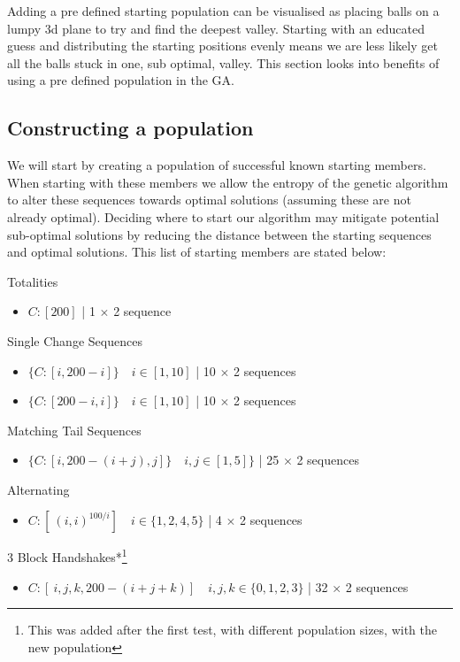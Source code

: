 Adding a pre defined starting population can be visualised as placing balls on a lumpy 3d plane to try and find the deepest valley.
Starting with an educated guess and distributing the starting positions evenly means we are less likely get all the balls stuck in one, sub optimal, valley.
This section looks into benefits of using a pre defined population in the GA.

\subsection{Constructing a population}
We will start by creating a population of successful known starting members.
When starting with these members we allow the entropy of the genetic algorithm to alter these sequences towards optimal solutions (assuming these are not already optimal).
Deciding where to start our algorithm may mitigate potential sub-optimal solutions by reducing the distance between the starting sequences and optimal solutions.
This list of starting members are stated below:

Totalities
\begin{itemize}
    \item \(C:[200]\) | 1 $\times$ 2 sequence 
\end{itemize}

Single Change Sequences
\begin{itemize}
    \item \(\{C:[i,200-i]\} \quad i\in [1,10]\) | 10 $\times$ 2 sequences
    \item \(\{C:[200-i,i]\} \quad i\in [1,10]\) | 10 $\times$ 2 sequences
\end{itemize}

Matching Tail Sequences
\begin{itemize}
    \item \(\{C:[i,200-(i+j),j]\} \quad i,j \in [1,5]\}\) | 25 $\times$ 2 sequences
\end{itemize}

Alternating
\begin{itemize}
    \item \(C:[\ (i,i)^{100/i}] \quad i \in \{1,2,4,5\}\) | 4 $\times$ 2 sequences
\end{itemize}

3 Block Handshakes*\footnote{This was added after the first test, with different population sizes, with the new population}
\begin{itemize}
    \item \(C:[\ i,j,k,200-(i+j+k)] \quad i,j,k \in \{0,1,2,3\}\) | 32 $\times$ 2 sequences
\end{itemize}


